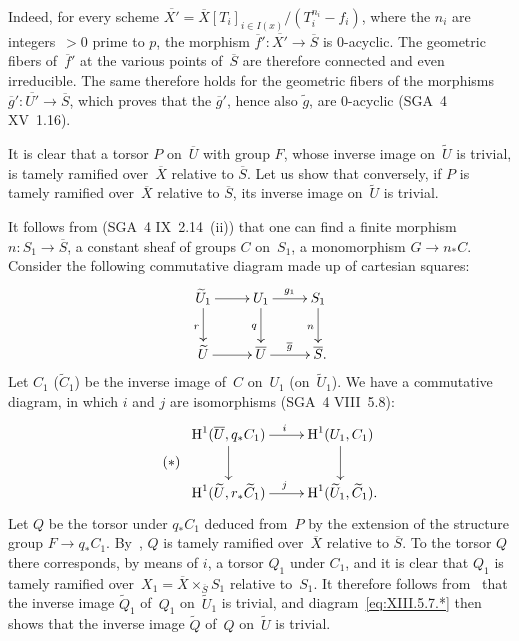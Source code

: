 Indeed, for every scheme
$\overline{X'}=\overline{X}[T_{i}]_{i\in I(x)}\big/
(T_{i}^{n_{i}}-f_{i})$, where the $n_{i}$ are integers~$>0$
prime to $p$, the morphism
$\overline{f}'\colon\overline{X'}\to\overline{S}$ is $0$-acyclic.
The geometric fibers of~$\overline{f}'$ at the various
points of~$\overline{S}$ are therefore connected and even
irreducible. The same therefore holds for the geometric fibers
of the morphisms
$\overline{g}'\colon\overline{U'}\to\overline{S}$, which proves that
the $\overline{g}'$, hence also $\tilde g$, are
$0$-acyclic (SGA~4 XV~1.16).

It is clear that a torsor $P$ on~$\overline{U}$ with group $F$, whose
inverse image on~$\widetilde{U}$ is trivial, is
tamely ramified over~$\overline{X}$ relative to
$\overline{S}$. Let us show that conversely, if $P$ is
tamely ramified over~$\overline{X}$ relative to
$\overline{S}$, its inverse image on~$\widetilde{U}$ is trivial.

It follows from (SGA~4 IX~2.14~(ii)) that one can find a
finite morphism $n\colon S_{1}\to\overline{S}$, a constant sheaf of groups
$C$ on~$S_{1}$, a monomorphism $G\to n_*C$.
Consider the following commutative diagram made up of
cartesian squares:
$$
\xymatrix{ \widetilde{U}_{1} \ar[r] \ar[d]_{r} &U_{1} \ar[r]^{g_{1}}
\ar[d]_{q} &S_{1} \ar[d]_{n} \cr \widetilde{U} \ar[r] &\overline{U}
\ar[r]^{\overline{g}} &\overline{S} \rlap{\quoi.}\cr }
$$
Let
$C_{1}$ (\resp $\widetilde{C}_{1}$) be the inverse image of~$C$ on~$U_{1}$
(\resp on~$\widetilde{U}_{1}$). We have a commutative diagram, in
which $i$ and $j$ are isomorphisms (SGA~4 VIII~5.8):
\begin{equation*}
\label{eq:XIII.5.7.*}
\tag{$*$}
\begin{array}{c}
\xymatrix{ \H^{1}(\overline{U},q_*C_{1}) \ar[r]^{i}
\ar[d] &\H^{1}(U_{1},C_{1}) \ar[d] \cr
\H^{1}(\widetilde{U},r_*\widetilde{C}_{1}) \ar[r]^{j}
&\H^{1}(\widetilde{U}_{1},\widetilde{C}_{1}) \rlap{\quoi.}\cr }
\end{array}
\end{equation*}
Let $Q$ be the torsor under $q_*C_{1}$ deduced from~$P$ by
the extension of the structure group $F\to q_*C_{1}$.
By~, $Q$ is tamely ramified
over~$\overline{X}$ relative to $\overline{S}$. To the torsor $Q$
there corresponds, by means of $i$, a torsor $Q_{1}$ under $C_{1}$, and
it is clear that $Q_{1}$ is tamely ramified over~$X_{1}=\overline{X}\times_{\overline{S}}S_{1}$ relative to~$S_{1}$. It therefore follows from~ that the inverse image
$\widetilde{Q}_{1}$ of~$Q_{1}$ on~$\widetilde{U}_{1}$ is trivial,
and diagram~\eqref{eq:XIII.5.7.*} then shows that the inverse image
$\widetilde{Q}$ of~$Q$ on~$\widetilde{U}$ is trivial.

